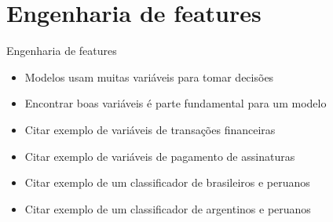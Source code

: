 \section{Engenharia de features}

\begin{frame}	
	\begin{block}{Engenharia de features}
		\begin{itemize}
			\item Modelos usam muitas variáveis para tomar decisões
			\item Encontrar boas variáveis é parte fundamental para um modelo
			\item Citar exemplo de variáveis de transações financeiras
			\item Citar exemplo de variáveis de pagamento de assinaturas
			\item Citar exemplo de um classificador de brasileiros e peruanos
			\item Citar exemplo de um classificador de argentinos e peruanos
		\end{itemize}		
	\end{block}
\end{frame}

